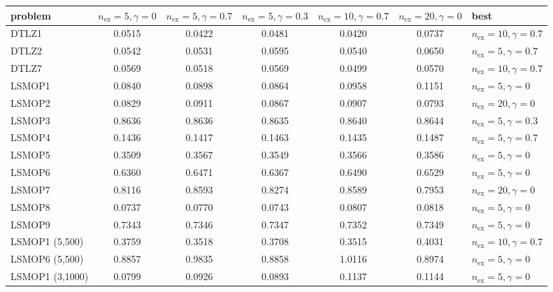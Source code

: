 \footnotesize
\setlength{\tabcolsep}{4pt}
\begin{tabular}{lcccccl}
\toprule
problem & $n_{\mathrm{ex}}{=}5,\gamma{=}0$ & $n_{\mathrm{ex}}{=}5,\gamma{=}0.7$ & $n_{\mathrm{ex}}{=}5,\gamma{=}0.3$ & $n_{\mathrm{ex}}{=}10,\gamma{=}0.7$ & $n_{\mathrm{ex}}{=}20,\gamma{=}0$ & best \\
\midrule
DTLZ1 & 0.0515 & 0.0422 & 0.0481 & 0.0420 & 0.0737 & $n_{\mathrm{ex}}{=}10,\gamma{=}0.7$ \\
DTLZ2 & 0.0542 & 0.0531 & 0.0595 & 0.0540 & 0.0650 & $n_{\mathrm{ex}}{=}5,\gamma{=}0.7$ \\
DTLZ7 & 0.0569 & 0.0518 & 0.0569 & 0.0499 & 0.0570 & $n_{\mathrm{ex}}{=}10,\gamma{=}0.7$ \\
LSMOP1 & 0.0840 & 0.0898 & 0.0864 & 0.0958 & 0.1151 & $n_{\mathrm{ex}}{=}5,\gamma{=}0$ \\
LSMOP2 & 0.0829 & 0.0911 & 0.0867 & 0.0907 & 0.0793 & $n_{\mathrm{ex}}{=}20,\gamma{=}0$ \\
LSMOP3 & 0.8636 & 0.8636 & 0.8635 & 0.8640 & 0.8644 & $n_{\mathrm{ex}}{=}5,\gamma{=}0.3$ \\
LSMOP4 & 0.1436 & 0.1417 & 0.1463 & 0.1435 & 0.1487 & $n_{\mathrm{ex}}{=}5,\gamma{=}0.7$ \\
LSMOP5 & 0.3509 & 0.3567 & 0.3549 & 0.3566 & 0.3586 & $n_{\mathrm{ex}}{=}5,\gamma{=}0$ \\
LSMOP6 & 0.6360 & 0.6471 & 0.6367 & 0.6490 & 0.6529 & $n_{\mathrm{ex}}{=}5,\gamma{=}0$ \\
LSMOP7 & 0.8116 & 0.8593 & 0.8274 & 0.8589 & 0.7953 & $n_{\mathrm{ex}}{=}20,\gamma{=}0$ \\
LSMOP8 & 0.0737 & 0.0770 & 0.0743 & 0.0807 & 0.0818 & $n_{\mathrm{ex}}{=}5,\gamma{=}0$ \\
LSMOP9 & 0.7343 & 0.7346 & 0.7347 & 0.7352 & 0.7349 & $n_{\mathrm{ex}}{=}5,\gamma{=}0$ \\
LSMOP1 (5,500) & 0.3759 & 0.3518 & 0.3708 & 0.3515 & 0.4031 & $n_{\mathrm{ex}}{=}10,\gamma{=}0.7$ \\
LSMOP6 (5,500) & 0.8857 & 0.9835 & 0.8858 & 1.0116 & 0.8974 & $n_{\mathrm{ex}}{=}5,\gamma{=}0$ \\
LSMOP1 (3,1000) & 0.0799 & 0.0926 & 0.0893 & 0.1137 & 0.1144 & $n_{\mathrm{ex}}{=}5,\gamma{=}0$ \\
\bottomrule
\end{tabular}

